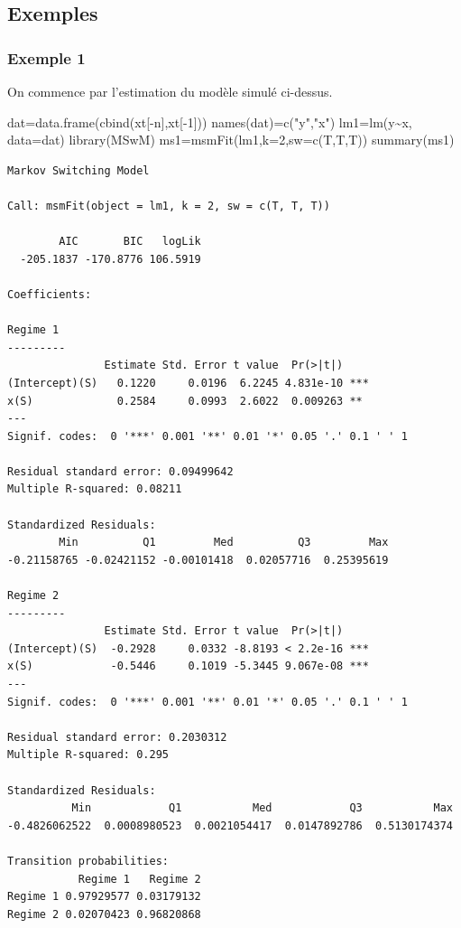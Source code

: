 \documentclass[
  french,
]{article}
\newenvironment{Shaded}{\begin{snugshade}}{\end{snugshade}}
\newcommand{\AttributeTok}[1]{\textcolor[rgb]{0.77,0.63,0.00}{#1}}
\newcommand{\DecValTok}[1]{\textcolor[rgb]{0.00,0.00,0.81}{#1}}
\newcommand{\FunctionTok}[1]{\textcolor[rgb]{0.00,0.00,0.00}{#1}}
\newcommand{\NormalTok}[1]{#1}
\newcommand{\OtherTok}[1]{\textcolor[rgb]{0.56,0.35,0.01}{#1}}
\newcommand{\SpecialCharTok}[1]{\textcolor[rgb]{0.00,0.00,0.00}{#1}}
\newcommand{\StringTok}[1]{\textcolor[rgb]{0.31,0.60,0.02}{#1}}
\begin{document}
\hypertarget{exemples}{%
\subsection{Exemples}\label{exemples}}

\hypertarget{exemple-1}{%
\subsubsection{Exemple 1}\label{exemple-1}}

On commence par l'estimation du modèle simulé ci-dessus.

\begin{Shaded}
\begin{Highlighting}[]
\NormalTok{dat}\OtherTok{=}\FunctionTok{data.frame}\NormalTok{(}\FunctionTok{cbind}\NormalTok{(xt[}\SpecialCharTok{{-}}\NormalTok{n],xt[}\SpecialCharTok{{-}}\DecValTok{1}\NormalTok{]))}
\FunctionTok{names}\NormalTok{(dat)}\OtherTok{=}\FunctionTok{c}\NormalTok{(}\StringTok{"y"}\NormalTok{,}\StringTok{"x"}\NormalTok{)}
\NormalTok{lm1}\OtherTok{=}\FunctionTok{lm}\NormalTok{(y}\SpecialCharTok{\textasciitilde{}}\NormalTok{x, }\AttributeTok{data=}\NormalTok{dat)}
\FunctionTok{library}\NormalTok{(MSwM)}
\NormalTok{ms1}\OtherTok{=}\FunctionTok{msmFit}\NormalTok{(lm1,}\AttributeTok{k=}\DecValTok{2}\NormalTok{,}\AttributeTok{sw=}\FunctionTok{c}\NormalTok{(T,T,T))}
\FunctionTok{summary}\NormalTok{(ms1)}
\end{Highlighting}
\end{Shaded}

\begin{verbatim}
Markov Switching Model

Call: msmFit(object = lm1, k = 2, sw = c(T, T, T))

        AIC       BIC   logLik
  -205.1837 -170.8776 106.5919

Coefficients:

Regime 1 
---------
               Estimate Std. Error t value  Pr(>|t|)    
(Intercept)(S)   0.1220     0.0196  6.2245 4.831e-10 ***
x(S)             0.2584     0.0993  2.6022  0.009263 ** 
---
Signif. codes:  0 '***' 0.001 '**' 0.01 '*' 0.05 '.' 0.1 ' ' 1

Residual standard error: 0.09499642
Multiple R-squared: 0.08211

Standardized Residuals:
        Min          Q1         Med          Q3         Max 
-0.21158765 -0.02421152 -0.00101418  0.02057716  0.25395619 

Regime 2 
---------
               Estimate Std. Error t value  Pr(>|t|)    
(Intercept)(S)  -0.2928     0.0332 -8.8193 < 2.2e-16 ***
x(S)            -0.5446     0.1019 -5.3445 9.067e-08 ***
---
Signif. codes:  0 '***' 0.001 '**' 0.01 '*' 0.05 '.' 0.1 ' ' 1

Residual standard error: 0.2030312
Multiple R-squared: 0.295

Standardized Residuals:
          Min            Q1           Med            Q3           Max 
-0.4826062522  0.0008980523  0.0021054417  0.0147892786  0.5130174374 

Transition probabilities:
           Regime 1   Regime 2
Regime 1 0.97929577 0.03179132
Regime 2 0.02070423 0.96820868
\end{verbatim}
\end{document}
